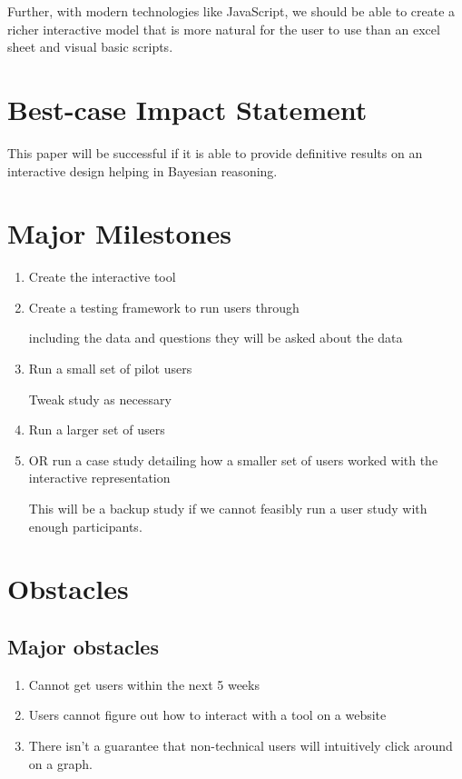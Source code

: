 \documentclass{proc}
\begin{document}
Further, with modern technologies like JavaScript, we should be able to create a richer interactive model 
that is more natural for the user to use than an excel sheet and visual basic scripts. 


\section{Best-case Impact Statement}
This paper will be successful if it is able to provide definitive results on an interactive design helping in 
Bayesian reasoning. 

\section{Major Milestones}

\begin{enumerate}
    \item Create the interactive tool
    \item Create a testing framework to run users through

    including the data and questions they will be asked about the data

    \item Run a small set of pilot users

    Tweak study as necessary

    \item Run a larger set of users

    \item OR run a case study detailing how a smaller set of users worked with the interactive representation

    This will be a backup study if we cannot feasibly run a user study with enough participants. 
    
\end{enumerate}

\section{Obstacles}

\subsection{Major obstacles} %

\begin{enumerate}
    \item Cannot get users within the next 5 weeks
    \item Users cannot figure out how to interact with a tool on a website
    \item There isn't a guarantee that non-technical users will intuitively click around on a graph. 

\end{enumerate}
\end{document}
